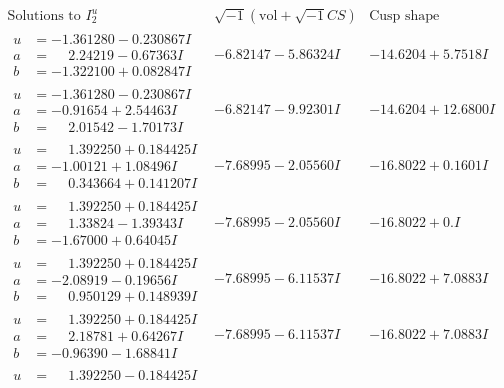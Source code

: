 \documentclass[1p]{elsarticle_modified}
\theoremstyle{definition}
\newcommand{\I}{\sqrt{-1}}
\begin{document}
$$\begin{array}{c|c|c}
\text{Solutions to }I^u_{2}& \I (\text{vol} + \sqrt{-1}CS) & \text{Cusp shape}\\
 \hline 
\begin{aligned}
u &= -1.361280 - 0.230867 I \\
a &= \phantom{-}2.24219 - 0.67363 I \\
b &= -1.322100 + 0.082847 I\end{aligned}
 & -6.82147 - 5.86324 I & -14.6204 + 5.7518 I \\ \hline\begin{aligned}
u &= -1.361280 - 0.230867 I \\
a &= -0.91654 + 2.54463 I \\
b &= \phantom{-}2.01542 - 1.70173 I\end{aligned}
 & -6.82147 - 9.92301 I & -14.6204 + 12.6800 I \\ \hline\begin{aligned}
u &= \phantom{-}1.392250 + 0.184425 I \\
a &= -1.00121 + 1.08496 I \\
b &= \phantom{-}0.343664 + 0.141207 I\end{aligned}
 & -7.68995 - 2.05560 I & -16.8022 + 0.1601 I \\ \hline\begin{aligned}
u &= \phantom{-}1.392250 + 0.184425 I \\
a &= \phantom{-}1.33824 - 1.39343 I \\
b &= -1.67000 + 0.64045 I\end{aligned}
 & -7.68995 - 2.05560 I & -16.8022 + 0. I\phantom{ +0.000000I} \\ \hline\begin{aligned}
u &= \phantom{-}1.392250 + 0.184425 I \\
a &= -2.08919 - 0.19656 I \\
b &= \phantom{-}0.950129 + 0.148939 I\end{aligned}
 & -7.68995 - 6.11537 I & -16.8022 + 7.0883 I \\ \hline\begin{aligned}
u &= \phantom{-}1.392250 + 0.184425 I \\
a &= \phantom{-}2.18781 + 0.64267 I \\
b &= -0.96390 - 1.68841 I\end{aligned}
 & -7.68995 - 6.11537 I & -16.8022 + 7.0883 I \\ \hline\begin{aligned}
u &= \phantom{-}1.392250 - 0.184425 I \\

\end{aligned}
\end{array}$$
\end{document}
